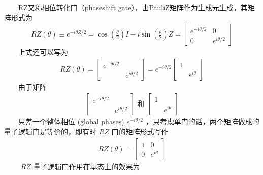 \documentclass[a4paper,11pt,english]{sphinxmanual}
\begin{document}
\sphinxAtStartPar
  RZ又称相位转化门（phase\sphinxhyphen{}shift gate），由Pauli\sphinxhyphen{}Z矩阵作为生成元生成，其矩阵形式为
\begin{equation*}
\begin{split}RZ(\theta) \equiv e^{-i \theta Z / 2}=\cos \left(\frac{\theta}{2}\right) I-i \sin \left(\frac{\theta}{2}\right) Z=\left[\begin{array}{cc} e^{-i \theta / 2} & 0 \\ 0 & e^{i \theta / 2} \end{array}\right]\end{split}
\end{equation*}
\sphinxAtStartPar
  上式还可以写为
\begin{equation*}
\begin{split}RZ(\theta)=\left[\begin{array}{cc} e^{-i \theta / 2} & \\ & e^{i \theta / 2} \end{array}\right]=e^{-i \theta / 2}\left[\begin{array}{ll} 1 & \\ & e^{i \theta} \end{array}\right]\end{split}
\end{equation*}
\sphinxAtStartPar
  由于矩阵
\begin{equation*}
\begin{split}\left[\begin{array}{ll} e^{-i \theta / 2} & \\ & e^{i \theta / 2} \end{array}\right] \text { 和 }\left[\begin{array}{ll} 1 & \\ & e^{i \theta} \end{array}\right]\end{split}
\end{equation*}
\sphinxAtStartPar
  只差一个整体相位 (global phases)  \(e^{-i \theta / 2}\) ，只考虑单门的话，两个矩阵做成的量子逻辑门是等价的，即有时 \(RZ\) 门的矩阵形式写作
\begin{equation*}
\begin{split}RZ(\theta)=\left[\begin{array}{ll} 1 & 0 \\ 0 & e^{i \theta} \end{array}\right]\end{split}
\end{equation*}
\sphinxAtStartPar
   \(RZ\) 量子逻辑门作用在基态上的效果为
\end{document}
